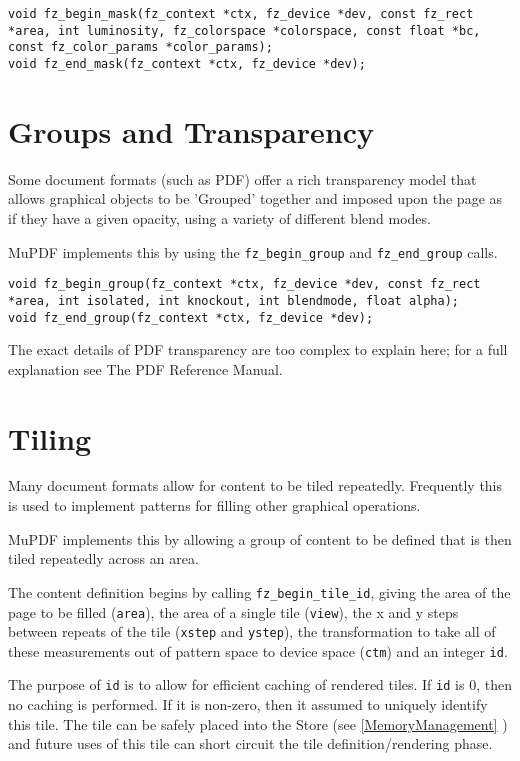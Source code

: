 \documentclass[oneside]{book}
\newcommand{\rjwref}[1] {\autoref{#1} \nameref{#1}}
\begin{document}
\begin{lstlisting}
void fz_begin_mask(fz_context *ctx, fz_device *dev, const fz_rect *area, int luminosity, fz_colorspace *colorspace, const float *bc, const fz_color_params *color_params);
void fz_end_mask(fz_context *ctx, fz_device *dev);
\end{lstlisting}

\section{Groups and Transparency}

Some document formats (such as PDF) offer a rich transparency model that allows graphical objects to be 'Grouped' together and imposed upon the page as if they have a given opacity, using a variety of different blend modes.

MuPDF implements this by using the \texttt{fz\_begin\_group} and \texttt{fz\_end\_group} calls.

\begin{lstlisting}
void fz_begin_group(fz_context *ctx, fz_device *dev, const fz_rect *area, int isolated, int knockout, int blendmode, float alpha);
void fz_end_group(fz_context *ctx, fz_device *dev);
\end{lstlisting}

The exact details of PDF transparency are too complex to explain here; for a full explanation see The PDF Reference Manual.

\section{Tiling}

Many document formats allow for content to be tiled repeatedly. Frequently this is used to implement patterns for filling other graphical operations.

MuPDF implements this by allowing a group of content to be defined that is then tiled repeatedly across an area.

The content definition begins by calling \texttt{fz\_begin\_tile\_id}, giving the area of the page to be filled (\texttt{area}), the area of a single tile (\texttt{view}), the x and y steps between repeats of the tile (\texttt{xstep} and \texttt{ystep}), the transformation to take all of these measurements out of pattern space to device space (\texttt{ctm}) and an integer \texttt{id}.

The purpose of \texttt{id} is to allow for efficient caching of rendered tiles. If  \texttt{id} is 0, then no caching is performed. If it is non-zero, then it assumed to uniquely identify this tile. The tile can be safely placed into the Store (see \rjwref{MemoryManagement}) and future uses of this tile can short circuit the tile definition\slash rendering phase.
\end{document}
